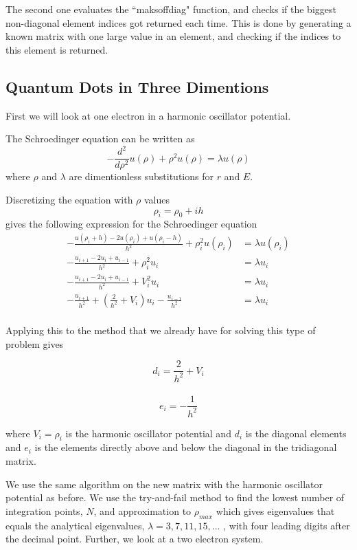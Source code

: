 \documentclass{article}
\begin{document}
The second one evaluates the ``maksoffdiag" function, and checks if the biggest non-diagonal element indices got returned each time. This is done by generating a known matrix with one large value in an element, and checking if the indices to this element is returned.

\subsection{Quantum Dots in Three Dimentions}


First we will look at one electron in a harmonic oscillator potential.

The Schroedinger equation can be written as
$$-\frac{d^2}{d\rho^2}u(\rho)+\rho^2u(\rho)=\lambda u(\rho)$$
where $\rho$ and $\lambda$ are dimentionless substitutions for $r$ and $E$.

Discretizing the equation with $\rho$ values
$$\rho_i=\rho_0+ih$$
gives the following expression for the Schroedinger equation
\begin{equation*}
\begin{split}
-\frac{u(\rho_i+h)-2u(\rho_i)+u(\rho_i-h)}{h^2}+\rho_i^2u(\rho_i)&=\lambda u(\rho_i)\\
-\frac{u_{i+1}-2u_i+u_{i-1}}{h^2}+\rho_i^2u_i&=\lambda u_i\\
-\frac{u_{i+1}-2u_i+u_{i-1}}{h^2}+V_i^2u_i&=\lambda u_i\\
-\frac{u_{i+1}}{h^2}+(\tfrac{2}{h^2}+V_i)u_i-\frac{u_{i-1}}{h^2}&=\lambda u_i\\
\end{split}
\end{equation*}


Applying this to the method that we already have for solving this type of problem gives

$$d_i=\frac{2}{h^2}+V_i$$\\
$$e_i=-\frac{1}{h^2}$$

where $V_i=\rho_i$ is the harmonic oscillator potential and $d_i$ is the diagonal elements and $e_i$ is the elements directly above and below the diagonal in the tridiagonal matrix.

We use the same algorithm on the new matrix with the harmonic oscillator potential as before. We use the try-and-fail method to find the lowest number of integration points, $N$, and approximation to $\rho_{max}$ which gives eigenvalues that equals the analytical eigenvalues, $\lambda=3, 7, 11, 15,...$ , with four leading digits after the decimal point.
\vskip0.7cm
Further, we look at a two electron system. 
\end{document}
